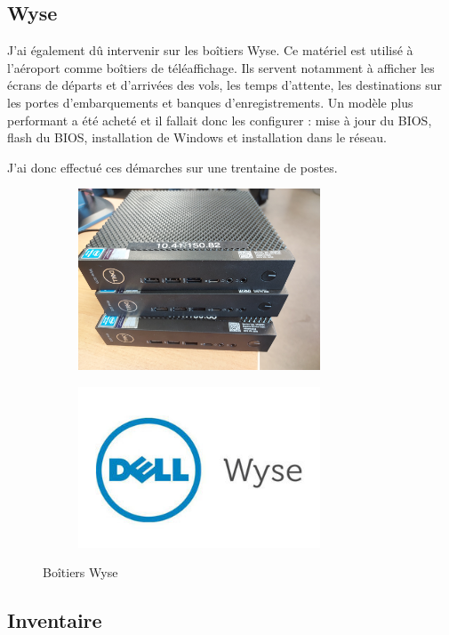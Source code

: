 \subsection{Wyse}

J’ai également dû intervenir sur les boîtiers Wyse. Ce matériel est utilisé à l’aéroport comme boîtiers de téléaffichage. Ils servent notamment à afficher les écrans de départs et d’arrivées des vols, les temps d’attente, les destinations sur les portes d’embarquements et banques d'enregistrements. Un modèle plus performant a été acheté et il fallait donc les configurer : mise à jour du BIOS, flash du BIOS, installation de Windows et installation dans le réseau.


J’ai donc effectué ces démarches sur une trentaine de postes.\newline

\begin{figure}[hbt!]
  \begin{subfigure}{0.5\textwidth}
    \centering
    \includegraphics[width=7.2cm]{Images/wyse.jpg}  
    \label{fig:wyse}
  \end{subfigure}
  \begin{subfigure}{0.5\textwidth}
    \centering
    \includegraphics[width=7.2cm]{Images/wyse_logo.jpg}  
    \label{fig:logowyse}
  \end{subfigure}
  \caption{Boîtiers Wyse}
\end{figure}

\subsection{Inventaire}

